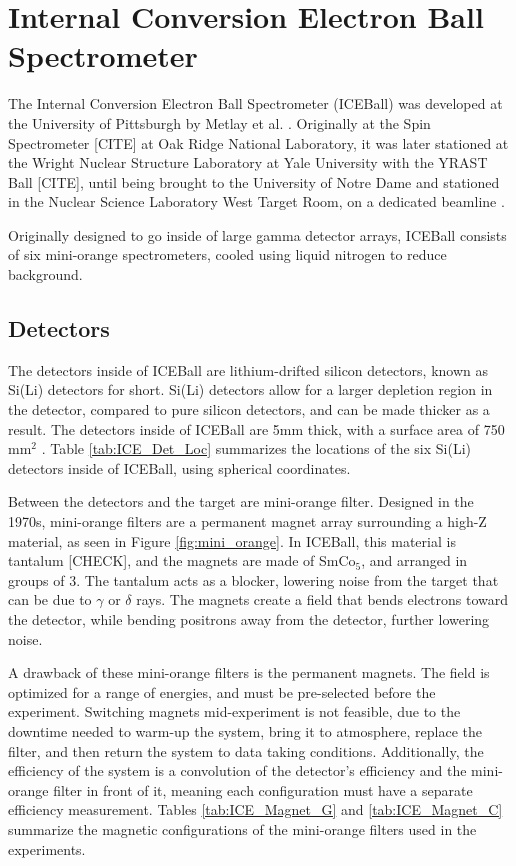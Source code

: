 \section{Internal Conversion Electron Ball Spectrometer}

The Internal Conversion Electron Ball Spectrometer (ICEBall) was developed at the University of Pittsburgh by Metlay et al. \citep{metlay92:_iceball_comm,metlay93:_iceball_comm}. Originally at the Spin Spectrometer [CITE] at Oak Ridge National Laboratory, it was later stationed at the Wright Nuclear Structure Laboratory at Yale University with the YRAST Ball [CITE], until being brought to the University of Notre Dame and stationed in the Nuclear Science Laboratory West Target Room, on a dedicated beamline \citep{battaglia15:_iceball_176lu}.

Originally designed to go inside of large gamma detector arrays, ICEBall consists of six mini-orange spectrometers, cooled using liquid nitrogen to reduce background. 

\subsection{Detectors}

The detectors inside of ICEBall are lithium-drifted silicon detectors, known as Si(Li) detectors for short. Si(Li) detectors allow for a larger depletion region in the detector, compared to pure silicon detectors, and can be made thicker as a result. The detectors inside of ICEBall are 5mm thick, with a surface area of 750 mm$^2$ \citep{metlay93:_iceball_comm}. Table \ref{tab:ICE_Det_Loc} summarizes the locations of the six Si(Li) detectors inside of ICEBall, using spherical coordinates.



Between the detectors and the target are mini-orange filter. Designed in the 1970s, mini-orange filters are a permanent magnet array surrounding a high-Z material, as seen in Figure \ref{fig:mini_orange}. In ICEBall, this material is tantalum [CHECK], and the magnets are made of SmCo$_5$, and arranged in groups of 3. The tantalum acts as a blocker, lowering noise from the target that can be due to $\gamma$ or $\delta$ rays. The magnets create a field that bends electrons toward the detector, while bending positrons away from the detector, further lowering noise. 



A drawback of these mini-orange filters is the permanent magnets. The field is optimized for a range of energies, and must be pre-selected before the experiment. Switching magnets mid-experiment is not feasible, due to the downtime needed to warm-up the system, bring it to atmosphere, replace the filter, and then return the system to data taking conditions. Additionally, the efficiency of the system is a convolution of the detector's efficiency and the mini-orange filter in front of it, meaning each configuration must have a separate efficiency measurement. Tables \ref{tab:ICE_Magnet_G} and \ref{tab:ICE_Magnet_C} summarize the magnetic configurations of the mini-orange filters used in the experiments.

